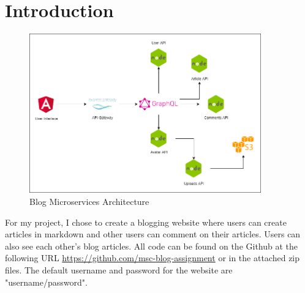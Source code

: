 \section{Introduction}

\begin{figure}[H]
  \centering
  \includegraphics[scale=0.5,width=100mm]{./images/architecture.png}
  \caption{Blog Microservices Architecture}
  \label{fig:graph-error-bars}
\end{figure}

For my project, I chose to create a blogging website where users can create articles in markdown and other users can comment on their articles. Users can also see each other's blog articles. All code can be found on the Github at the following URL \url{https://github.com/msc-blog-assignment} or in the attached zip files. The default username and password for the website are "username/password".
